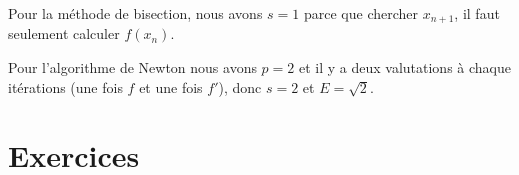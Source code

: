 \begin{example}[Bisection]
    Pour la méthode de bisection, nous avons \( s=1\) parce que chercher \( x_{n+1}\), il faut seulement calculer \( f(x_n)\).
\end{example}

\begin{example}[Newton]
    Pour l'algorithme de Newton nous avons \( p=2\) et il y a deux valutations à chaque itérations (une fois \( f\) et une fois \( f'\)), donc \( s=2\) et \( E=\sqrt{ 2 }\).
\end{example}

\section{Exercices}


